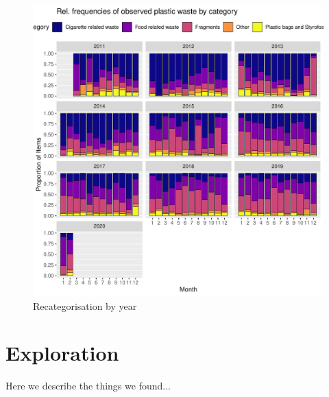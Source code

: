\documentclass[10pt]{article}\usepackage[]{graphicx}\usepackage[]{color}
\makeatletter
\def\maxwidth{ %
  \ifdim\Gin@nat@width>\linewidth
    \linewidth
  \else
    \Gin@nat@width
  \fi
}
\newenvironment{knitrout}{}{} %
\makeatother
\begin{document}
\begin{figure}[H] %
\begin{center}
\begin{knitrout}
\color{fgcolor}
\includegraphics[width=\maxwidth]{figure/unnamed-chunk-8-1} 

\end{knitrout}
\caption {Recategorisation by year}
\label{figB}
\end {center}
\end {figure}



\pagebreak
\section{Exploration}

Here we describe the things we found... 
\end{document}
